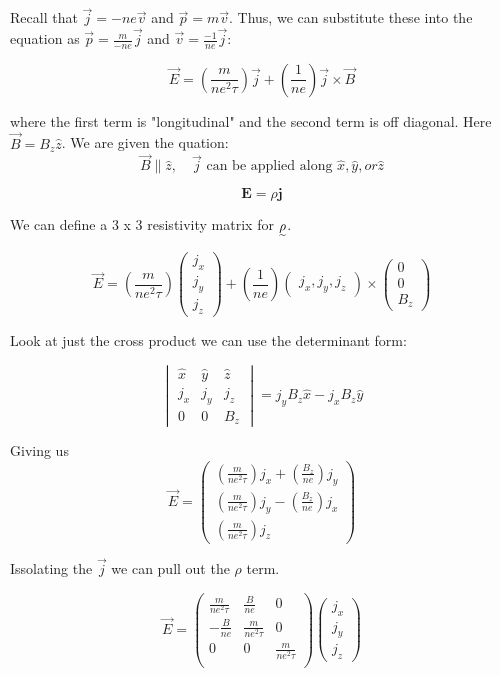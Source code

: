 \begin{enumerate}[label=(\alph*)]
Recall that $\vec{j} = -ne \vec{v}$ and $\vec{p} = m \vec{v}$. Thus, we can substitute these into the equation as $\vec{p} = \frac{m}{-ne} \vec{j}$ and $\vec{v} = \frac{-1}{ne} \vec{j}$:

\[ \vec{E} = \left( \frac{m}{ne^2 \tau} \right) \vec{j} + \left( \frac{1}{ne} \right) \vec{j} \times \vec{B} \]

where the first term is "longitudinal"  and the second term is off diagonal. Here $\vec{B} = B_z \hat{z}$. We are given the quation:
\[ \vec{B} \parallel \hat{z}, \quad \vec{j} \text{ can be applied along } \hat{x}, \hat{y}, or \hat{z} \]
    
\[ \mathbf{E} = \rho \mathbf{j} \]

We can define a 3 x 3 resistivity matrix for $\undertilde{\rho}$.

\[ \vec{E} = \left( \frac{m}{ne^2 \tau} \right) \begin{pmatrix}
    j_x \\ j_y \\ j_z
\end{pmatrix} + \left(\frac{1}{ne} \right) \begin{pmatrix}
    j_x , j_y , j_z
\end{pmatrix} \times \begin{pmatrix}
    0 \\ 0 \\ B_z
\end{pmatrix} \]

Look at just the cross product we can use the determinant form:

\[ \begin{vmatrix}
    \hat{x} & \hat{y} & \hat{z} \\
    j_x & j_y & j_z \\
    0 & 0 & B_z
\end{vmatrix}  =  j_y B_z \hat{x} - j_x B_z \hat{y} \]


Giving us
\[ \vec{E} = \begin{pmatrix}
\left( \frac{m}{ne^2 \tau} \right) j_x + \left(\frac{B_z}{ne} \right) j_y \\
\left( \frac{m}{ne^2 \tau} \right) j_y - \left(\frac{B_z}{ne} \right) j_x \\
\left( \frac{m}{ne^2 \tau} \right) j_z
\end{pmatrix} \]

Issolating the $\vec{j}$ we can pull out the $\rho$ term.

\[ \vec{E} = \begin{pmatrix}
    \frac{m}{ne^2\tau}& \frac{B}{ne}& 0 \\
    -\frac{B}{ne}&\frac{m}{ne^2\tau}& 0 \\
    0& 0& \frac{m}{ne^2\tau}\\
\end{pmatrix}
\begin{pmatrix}
    j_x \\ j_y \\ j_z
\end{pmatrix}\]


\end{enumerate}
